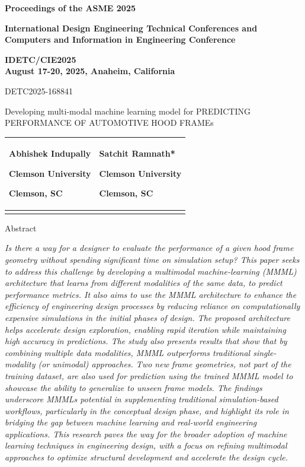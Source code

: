 \documentclass[11pt]{article}
\begin{document}
\hfill\break
\textbf{Proceedings of the ASME 2025}

\textbf{International Design Engineering Technical Conferences and\\
Computers and Information in Engineering Conference}

\textbf{IDETC/CIE2025\\
August 17-20, 2025, Anaheim, California}

DETC2025-168841

Developing multi-modal machine learning model for PREDICTING PERFORMANCE
OF AUTOMOTIVE HOOD FRAMEs

{\def\LTcaptype{none} %
\begin{longtable}[]{@{}
  >{\raggedright\arraybackslash}p{}
  >{\raggedright\arraybackslash}p{}@{}}
\toprule\noalign{}
\begin{minipage}[b]{\linewidth}\centering
\textbf{Abhishek Indupally}

Clemson University

Clemson, SC
\end{minipage} & \begin{minipage}[b]{\linewidth}\centering
\textbf{Satchit Ramnath*}

Clemson University

Clemson, SC
\end{minipage} \\
\midrule\noalign{}
\endhead
\bottomrule\noalign{}
\endlastfoot
\end{longtable}
}

Abstract

\emph{Is there a way for a designer to evaluate the performance of a
given hood frame geometry without spending significant time on
simulation setup? This paper seeks to address this challenge by
developing a multimodal machine-learning (MMML) architecture that learns
from different modalities of the same data, to predict performance
metrics. It also aims to use the MMML architecture to enhance the
efficiency of engineering design processes by reducing reliance on
computationally expensive simulations in the initial phases of design.
The proposed architecture helps accelerate design exploration, enabling
rapid iteration while maintaining high accuracy in predictions. The
study also presents results that show that by combining multiple data
modalities, MMML outperforms traditional single-modality (or unimodal)
approaches. Two new frame geometries, not part of the training dataset,
are also used for prediction using the trained MMML model to showcase
the ability to generalize to unseen frame models. The findings
underscore MMML\textquotesingle s potential in supplementing traditional
simulation-based workflows, particularly in the conceptual design phase,
and highlight its role in bridging the gap between machine learning and
real-world engineering applications. This research paves the way for the
broader adoption of machine learning techniques in engineering design,
with a focus on refining multimodal approaches to optimize structural
development and accelerate the design cycle.}
\end{document}
